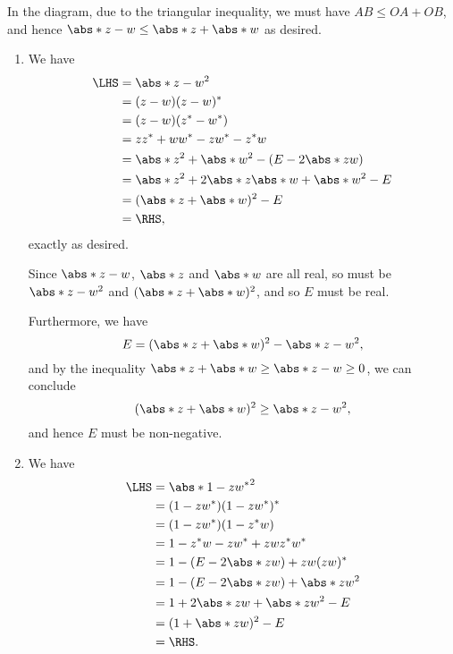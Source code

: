\Question{\currfilebase}

\begin{center}
    
\end{center}

In the diagram, due to the triangular inequality, we must have \(AB \leq OA + OB\), and hence \(\abs*{z - w} \leq \abs*{z} + \abs*{w}\) as desired.

\begin{enumerate}
    \item We have
          \begin{align*}
              \LHS & = \abs*{z - w}^2                                    \\
                   & = (z - w)(z - w)^*                                  \\
                   & = (z - w)(z^* - w^*)                                \\
                   & = z z^* + w w^* - z w^* - z^* w                     \\
                   & = \abs*{z}^2 + \abs*{w}^2 - (E - 2\abs*{zw})        \\
                   & = \abs*{z}^2 + 2 \abs*{z} \abs*{w} + \abs*{w}^2 - E \\
                   & = (\abs*{z} + \abs*{w})^2 - E                       \\
                   & = \RHS,
          \end{align*}
          exactly as desired.

          Since \(\abs*{z - w}\), \(\abs*{z}\) and \(\abs*{w}\) are all real, so must be \(\abs*{z - w}^2\) and \((\abs*{z} + \abs*{w})^2\), and so \(E\) must be real.

          Furthermore, we have
          \[
              E = (\abs*{z} + \abs*{w})^2 - \abs*{z - w}^2,
          \]
          and by the inequality \(\abs*{z} + \abs*{w} \geq \abs*{z - w} \geq 0\), we can conclude
          \[
              (\abs*{z} + \abs*{w})^2 \geq \abs*{z - w}^2,
          \]
          and hence \(E\) must be non-negative.

    \item We have
          \begin{align*}
              \LHS & = \abs*{1 - z w^*}^2                  \\
                   & = (1 - z w^*)(1 - z w^*)^*            \\
                   & = (1 - z w^*)(1 - z^* w)              \\
                   & = 1 - z^* w - z w^* + z w z^* w^*     \\
                   & = 1 - (E - 2 \abs*{zw}) + zw (zw)^*   \\
                   & = 1 - (E - 2 \abs*{zw}) + \abs*{zw}^2 \\
                   & = 1 + 2 \abs*{zw} + \abs*{zw}^2 - E   \\
                   & = (1 + \abs*{zw})^2 - E               \\
                   & = \RHS.
          \end{align*}
\end{enumerate}

